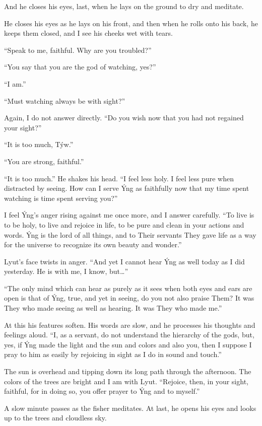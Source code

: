 And he closes his eyes, last, when he lays on the ground to dry and meditate.

He closes his eyes as he lays on his front, and then when he rolls onto his back, he keeps them closed, and I see his cheeks wet with tears.

``Speak to me, faithful. Why are you troubled?''

``You say that you are the god of watching, yes?''

``I am.''

``Must watching always be with sight?''

Again, I do not answer directly. ``Do you wish now that you had not regained your sight?''

``It is too much, Týw.''

``You are strong, faithful.''

``It is too much.'' He shakes his head. ``I feel less holy. I feel less pure when distracted by seeing. How can I serve Ýng as faithfully now that my time spent watching is time spent serving you?''

I feel Ýng's anger rising against me once more, and I answer carefully. ``To live is to be holy, to live and rejoice in life, to be pure and clean in your actions and words. Ýng is the lord of all things, and to Their servants They gave life as a way for the universe to recognize its own beauty and wonder.''

Lyut's face twists in anger. ``And yet I cannot hear Ýng as well today as I did yesterday. He is with me, I know, but\ldots''

``The only mind which can hear as purely as it sees when both eyes and ears are open is that of Ýng, true, and yet in seeing, do you not also praise Them? It was They who made seeing as well as hearing. It was They who made me.''

At this his features soften. His words are slow, and he processes his thoughts and feelings aloud. ``I, as a servant, do not understand the hierarchy of the gods, but, yes, if Ýng made the light and the sun and colors and also you, then I suppose I pray to him as easily by rejoicing in sight as I do in sound and touch.''

The sun is overhead and tipping down its long path through the afternoon. The colors of the trees are bright and I am with Lyut. ``Rejoice, then, in your sight, faithful, for in doing so, you offer prayer to Ýng and to myself.''

A slow minute passes as the fisher meditates. At last, he opens his eyes and looks up to the trees and cloudless sky.

